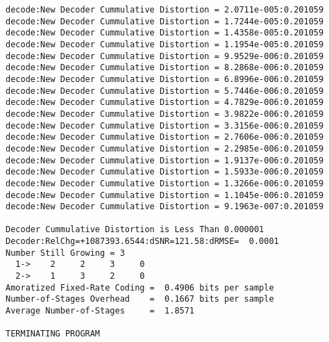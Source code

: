 \begin{verbatim}
decode:New Decoder Cummulative Distortion = 2.0711e-005:0.201059
decode:New Decoder Cummulative Distortion = 1.7244e-005:0.201059
decode:New Decoder Cummulative Distortion = 1.4358e-005:0.201059
decode:New Decoder Cummulative Distortion = 1.1954e-005:0.201059
decode:New Decoder Cummulative Distortion = 9.9529e-006:0.201059
decode:New Decoder Cummulative Distortion = 8.2868e-006:0.201059
decode:New Decoder Cummulative Distortion = 6.8996e-006:0.201059
decode:New Decoder Cummulative Distortion = 5.7446e-006:0.201059
decode:New Decoder Cummulative Distortion = 4.7829e-006:0.201059
decode:New Decoder Cummulative Distortion = 3.9822e-006:0.201059
decode:New Decoder Cummulative Distortion = 3.3156e-006:0.201059
decode:New Decoder Cummulative Distortion = 2.7606e-006:0.201059
decode:New Decoder Cummulative Distortion = 2.2985e-006:0.201059
decode:New Decoder Cummulative Distortion = 1.9137e-006:0.201059
decode:New Decoder Cummulative Distortion = 1.5933e-006:0.201059
decode:New Decoder Cummulative Distortion = 1.3266e-006:0.201059
decode:New Decoder Cummulative Distortion = 1.1045e-006:0.201059
decode:New Decoder Cummulative Distortion = 9.1963e-007:0.201059

Decoder Cummulative Distortion is Less Than 0.000001
Decoder:RelChg=+1087393.6544:dSNR=121.58:dRMSE=  0.0001
Number Still Growing = 3
  1->    2     2     3     0 
  2->    1     3     2     0 
Amoratized Fixed-Rate Coding =  0.4906 bits per sample
Number-of-Stages Overhead    =  0.1667 bits per sample
Average Number-of-Stages     =  1.8571

TERMINATING PROGRAM
\end{verbatim}
\normalsize


\clearpage
\newpage
\normalsize



